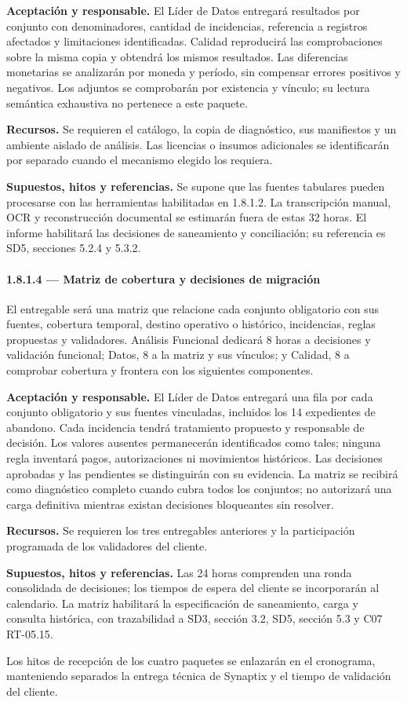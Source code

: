 \textbf{Aceptación y responsable.} El Líder de Datos entregará resultados por conjunto con denominadores, cantidad de incidencias, referencia a registros afectados y limitaciones identificadas. Calidad reproducirá las comprobaciones sobre la misma copia y obtendrá los mismos resultados. Las diferencias monetarias se analizarán por moneda y período, sin compensar errores positivos y negativos. Los adjuntos se comprobarán por existencia y vínculo; su lectura semántica exhaustiva no pertenece a este paquete.

\textbf{Recursos.} Se requieren el catálogo, la copia de diagnóstico, sus manifiestos y un ambiente aislado de análisis. Las licencias o insumos adicionales se identificarán por separado cuando el mecanismo elegido los requiera.

\textbf{Supuestos, hitos y referencias.} Se supone que las fuentes tabulares pueden procesarse con las herramientas habilitadas en 1.8.1.2. La transcripción manual, OCR y reconstrucción documental se estimarán fuera de estas 32 horas. El informe habilitará las decisiones de saneamiento y conciliación; su referencia es SD5, secciones 5.2.4 y 5.3.2.

\paragraph*{1.8.1.4 --- Matriz de cobertura y decisiones de migración}
El entregable será una matriz que relacione cada conjunto obligatorio con sus fuentes, cobertura temporal, destino operativo o histórico, incidencias, reglas propuestas y validadores. Análisis Funcional dedicará 8 horas a decisiones y validación funcional; Datos, 8 a la matriz y sus vínculos; y Calidad, 8 a comprobar cobertura y frontera con los siguientes componentes.

\textbf{Aceptación y responsable.} El Líder de Datos entregará una fila por cada conjunto obligatorio y sus fuentes vinculadas, incluidos los 14 expedientes de abandono. Cada incidencia tendrá tratamiento propuesto y responsable de decisión. Los valores ausentes permanecerán identificados como tales; ninguna regla inventará pagos, autorizaciones ni movimientos históricos. Las decisiones aprobadas y las pendientes se distinguirán con su evidencia. La matriz se recibirá como diagnóstico completo cuando cubra todos los conjuntos; no autorizará una carga definitiva mientras existan decisiones bloqueantes sin resolver.

\textbf{Recursos.} Se requieren los tres entregables anteriores y la participación programada de los validadores del cliente. 

\textbf{Supuestos, hitos y referencias.} Las 24 horas comprenden una ronda consolidada de decisiones; los tiempos de espera del cliente se incorporarán al calendario. La matriz habilitará la especificación de saneamiento, carga y consulta histórica, con trazabilidad a SD3, sección 3.2, SD5, sección 5.3 y C07 RT-05.15.

Los hitos de recepción de los cuatro paquetes se enlazarán en el cronograma, manteniendo separados la entrega técnica de Synaptix y el tiempo de validación del cliente.
